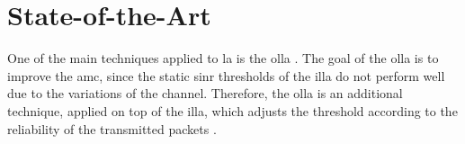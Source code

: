 %


%
%
%


\section{State-of-the-Art}

%

One of the main techniques applied to \gls{la} is the \gls{olla} \cite{Sampath1997}.
%
The goal of the \gls{olla} is to improve the \gls{amc}, since the static \gls{sinr} thresholds of the \gls{illa} do not perform well due to the variations of the channel.
%
Therefore, the \gls{olla} is an additional technique, applied on top of the \gls{illa}, which adjusts the threshold according to the reliability of the transmitted packets \cite{Blanquez-Casado2016}.

